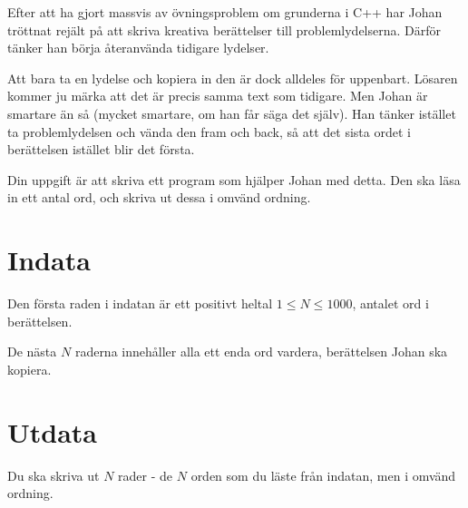 
Efter att ha gjort massvis av övningsproblem om grunderna i C++ har Johan tröttnat rejält på att skriva kreativa berättelser till problemlydelserna. Därför tänker han börja återanvända tidigare lydelser.

Att bara ta en lydelse och kopiera in den är dock alldeles för uppenbart. Lösaren kommer ju märka att det är precis samma text som tidigare. Men Johan är smartare än så (mycket smartare, om han får säga det själv). Han tänker istället ta problemlydelsen och vända den fram och back, så att det sista ordet i berättelsen istället blir det första.

Din uppgift är att skriva ett program som hjälper Johan med detta. Den ska läsa in ett antal ord, och skriva ut dessa i omvänd ordning.

\section*{Indata}
Den första raden i indatan är ett positivt heltal $1 \le N \le 1000$, antalet ord i berättelsen.

De nästa $N$ raderna innehåller alla ett enda ord vardera, berättelsen Johan ska kopiera.

\section*{Utdata}
Du ska skriva ut $N$ rader - de $N$ orden som du läste från indatan, men i omvänd ordning.
